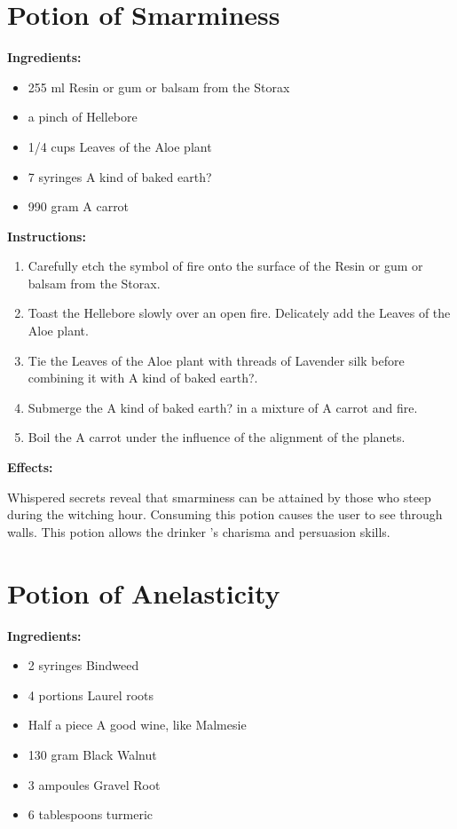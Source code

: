\documentclass{article}
\begin{document}
\newpage
\section*{Potion of Smarminess}

\textbf{Ingredients:}

\begin{itemize}
  \item 255 ml Resin or gum or balsam from the Storax
  \item a pinch of Hellebore
  \item 1/4 cups Leaves of the Aloe plant
  \item 7 syringes A kind of baked earth?
  \item 990 gram A carrot
\end{itemize}

\textbf{Instructions:}

\begin{enumerate}
  \item Carefully etch the symbol of fire onto the surface of the Resin or gum or balsam from the Storax.
  \item Toast the Hellebore slowly over an open fire. Delicately add the Leaves of the Aloe plant.
  \item Tie the Leaves of the Aloe plant with threads of Lavender silk before combining it with A kind of baked earth?.
  \item Submerge the A kind of baked earth? in a mixture of A carrot and fire.
  \item Boil the A carrot under the influence of the alignment of the planets.
\end{enumerate}

\textbf{Effects:}

Whispered secrets reveal that smarminess can be attained by those who steep during the witching hour. Consuming this potion causes the user to see through walls. This potion allows the drinker 's charisma and persuasion skills.

\newpage
\section*{Potion of Anelasticity}

\textbf{Ingredients:}

\begin{itemize}
  \item 2 syringes Bindweed
  \item 4 portions Laurel roots
  \item Half a piece A good wine, like Malmesie
  \item 130 gram Black Walnut
  \item 3 ampoules Gravel Root
  \item 6 tablespoons turmeric
\end{itemize}
\end{document}
